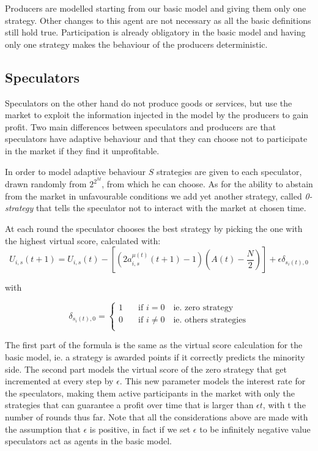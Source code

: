 Producers are modelled starting from our basic model and giving them only one strategy.
Other changes to this agent are not necessary as all the basic definitions still hold true.
Participation is already obligatory in the basic model and having only one strategy makes the behaviour of the producers deterministic.

\subsection{Speculators}

Speculators on the other hand do not produce goods or services, but use the market to exploit the information injected in the model by the producers to gain profit.
Two main differences between speculators and producers are that speculators have adaptive behaviour and that they can choose not to participate in the market if they find it unprofitable.

In order to model adaptive behaviour $S$ strategies are given to each speculator, drawn randomly from $2^{2^M}$, from which he can choose.
As for the ability to abstain from the market in unfavourable conditions we add yet another strategy, called \textit{0-strategy} that tells the speculator not to interact with the market at chosen time.

At each round the speculator chooses the best strategy by picking the one with the highest virtual score, calculated with:
\begin{displaymath}
U_{i,s}(t+1) = U_{i,s}(t) - [(2a_{i,s}^{\mu(t)}(t+1)-1)(A(t)-\frac{N}{2}) ] + \epsilon\delta_{s_i(t),0}
\end{displaymath}

with

\begin{displaymath}
\delta_{s_i(t),0} =
  \begin{cases}
    1       & \quad \text{if } i = 0 \quad \text{ie. zero strategy}\\
    0       & \quad \text{if } i \neq 0 \quad \text{ie. others strategies}\\
  \end{cases}
\end{displaymath}

The first part of the formula is the same as the virtual score calculation for the basic model, ie. a strategy is awarded points if it correctly predicts the minority side.
The second part models the virtual score of the zero strategy that get incremented at every step by $\epsilon$.
This new parameter models the interest rate for the speculators, making them active participants in the market with only the strategies that can guarantee a profit over time that is larger than $\epsilon t$, with t the number of rounds thus far.
Note that all the considerations above are made with the assumption that $\epsilon$ is positive, in fact if we set $\epsilon$ to be infinitely negative value speculators act as agents in the basic model.

